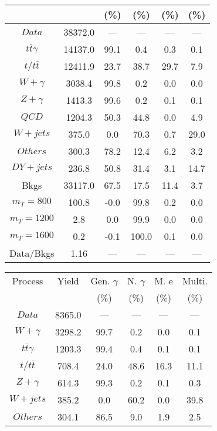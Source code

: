 \begin{figure}
\begin{minipage}[c]{0.32\textwidth}
{\begin{tabular}{cccccc}
 &  & (\%) & (\%) & (\%) & (\%)  \\
\hline
                                                                      $ Data $ &  38372.0 &  --- &  --- &  --- &  ---\\
$ t\bar{t}\gamma $ &  14137.0 &  99.1 &  0.4 &  0.3 &  0.1\\
$ t/t\bar{t} $ &  12411.9 &  23.7 &  38.7 &  29.7 &  7.9\\
$ W+\gamma $ &  3038.4 &  99.8 &  0.2 &  0.0 &  0.0\\
$ Z+\gamma $ &  1413.3 &  99.6 &  0.2 &  0.1 &  0.1\\
$ QCD $ &  1204.3 &  50.3 &  44.8 &  0.0 &  4.9\\
$ W+jets $ &  375.0 &  0.0 &  70.3 &  0.7 &  29.0\\
$ Others $ &  300.3 &  78.2 &  12.4 &  6.2 &  3.2\\
$ DY+jets $ &  236.8 &  50.8 &  31.4 &  3.1 &  14.7\\
Bkgs &  33117.0 &  67.5 &  17.5 &  11.4 &  3.7\\
$ m_{T} = 800 $ &  100.8 &  -0.0 &  99.8 &  0.2 &  0.0\\
$ m_{T} = 1200 $ &  2.8 &  0.0 &  99.9 &  0.0 &  0.0\\
$ m_{T} = 1600 $ &  0.2 &  -0.1 &  100.0 &  0.1 &  0.0\\
Data/Bkgs &  1.16 &  --- &  --- &  --- &  ---\\
\hline
\end{tabular}
}
\end{minipage}
\begin{minipage}[c]{0.32\textwidth}
\centering
\tiny{
\begin{tabular}{cccccc}
\hline
Process & Yield & Gen. $\gamma$ & N. $\gamma$ & M. e & Multi. \\
 &  & (\%) & (\%) & (\%) & (\%)  \\
\hline
                                                                      $ Data $ &  8365.0 &  --- &  --- &  --- &  ---\\
$ W+\gamma $ &  3298.2 &  99.7 &  0.2 &  0.0 &  0.1\\
$ t\bar{t}\gamma $ &  1203.3 &  99.4 &  0.4 &  0.1 &  0.1\\
$ t/t\bar{t} $ &  708.4 &  24.0 &  48.6 &  16.3 &  11.1\\
$ Z+\gamma $ &  614.3 &  99.3 &  0.2 &  0.1 &  0.3\\
$ W+jets $ &  385.2 &  0.0 &  60.2 &  0.0 &  39.8\\
$ Others $ &  304.1 &  86.5 &  9.0 &  1.9 &  2.5\\

\end{tabular}}
\end{minipage}
\end{figure}
